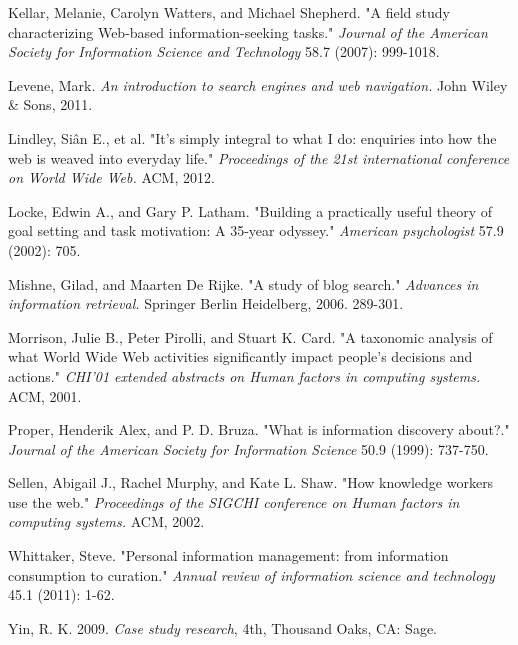 \documentclass{casconpaper}
\begin{document}
{\begin{thebibliography}{9}
Kellar, Melanie, Carolyn Watters, and Michael Shepherd. "A field study characterizing Web-based information-seeking tasks." \emph{Journal of the American Society for Information Science and Technology} 58.7 (2007): 999-1018.

Levene, Mark.  \emph{An introduction to search engines and web navigation.} John Wiley \& Sons, 2011.

Lindley, Siân E., et al. "It's simply integral to what I do: enquiries into how the web is weaved into everyday life." \emph{Proceedings of the 21st international conference on World Wide Web.} ACM, 2012.

Locke, Edwin A., and Gary P. Latham. "Building a practically useful theory of goal setting and task motivation: A 35-year odyssey." \emph{American psychologist} 57.9 (2002): 705.

Mishne, Gilad, and Maarten De Rijke. "A study of blog search." \emph{Advances in information retrieval.} Springer Berlin Heidelberg, 2006. 289-301.

Morrison, Julie B., Peter Pirolli, and Stuart K. Card. "A taxonomic analysis of what World Wide Web activities significantly impact people's decisions and actions." \emph{CHI'01 extended abstracts on Human factors in computing systems.} ACM, 2001.

Proper, Henderik Alex, and P. D. Bruza. "What is information discovery about?." \emph{Journal of the American Society for Information Science} 50.9 (1999): 737-750.

Sellen, Abigail J., Rachel Murphy, and Kate L. Shaw. "How knowledge workers use the web." \emph{Proceedings of the SIGCHI conference on Human factors in computing systems.} ACM, 2002.

Whittaker, Steve. "Personal information management: from information consumption to curation." \emph{Annual review of information science and technology} 45.1 (2011): 1-62.

 Yin, R. K. 2009. \emph{Case study research}, 4th, Thousand Oaks, CA: Sage.
    
\end{thebibliography}
} %
\end{document}
